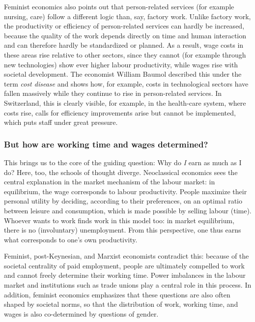 \documentclass[
  british,
  a4paper,
  DIV=11,
  numbers=noendperiod,
  oneside,
  openany]{scrreprt}
\begin{document}
Feminist economics also points out that person-related services (for
example nursing, care) follow a different logic than, say, factory work.
Unlike factory work, the productivity or efficiency of person-related
services can hardly be increased, because the quality of the work
depends directly on time and human interaction and can therefore hardly
be standardized or planned. As a result, wage costs in these areas rise
relative to other sectors, since they cannot (for example through new
technologies) show ever higher labour productivity, while wages rise
with societal development. The economist William Baumol described this
under the term \emph{cost disease} and shows how, for example, costs in
technological sectors have fallen massively while they continue to rise
in person-related services. In Switzerland, this is clearly visible, for
example, in the health-care system, where costs rise, calls for
efficiency improvements arise but cannot be implemented, which puts
staff under great pressure.

\subsubsection{But how are working time and wages
determined?}\label{but-how-are-working-time-and-wages-determined}

This brings us to the core of the guiding question: Why do \emph{I} earn
as much as I do? Here, too, the schools of thought diverge. Neoclassical
economics sees the central explanation in the market mechanism of the
labour market: in equilibrium, the wage corresponds to labour
productivity. People maximize their personal utility by deciding,
according to their preferences, on an optimal ratio between leisure and
consumption, which is made possible by selling labour (time). Whoever
wants to work finds work in this model too: in market equilibrium, there
is no (involuntary) unemployment. From this perspective, one thus earns
what corresponds to one's own productivity.

Feminist, post-Keynesian, and Marxist economists contradict this:
because of the societal centrality of paid employment, people are
ultimately compelled to work and cannot freely determine their working
time. Power imbalances in the labour market and institutions such as
trade unions play a central role in this process. In addition, feminist
economics emphasizes that these questions are also often shaped by
societal norms, so that the distribution of work, working time, and
wages is also co-determined by questions of gender.
\end{document}
